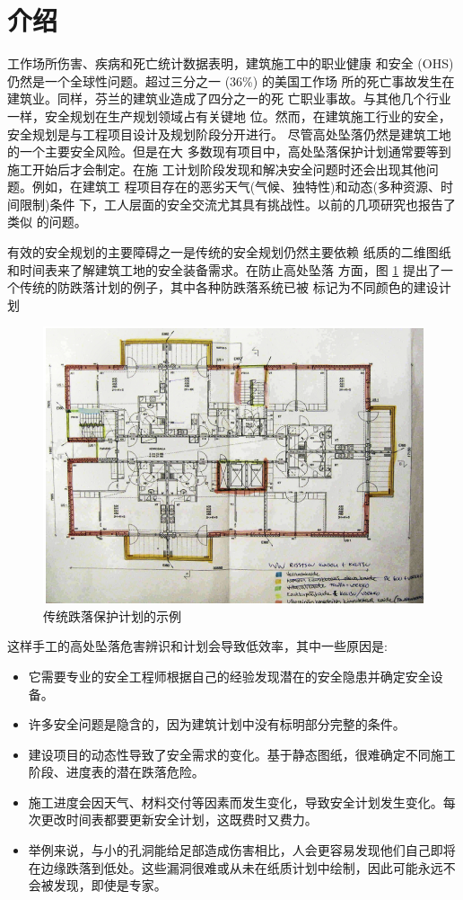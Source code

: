 \section{介绍}
工作场所伤害、疾病和死亡统计数据表明，建筑施工中的职业健康
和安全 (OHS) 仍然是一个全球性问题。超过三分之一 (36\%) 的美国工作场
所的死亡事故发生在建筑业。同样，芬兰的建筑业造成了四分之一的死
亡职业事故。与其他几个行业一样，安全规划在生产规划领域占有关键地
位。然而，在建筑施工行业的安全，安全规划是与工程项目设计及规划阶段分开进行。
尽管高处坠落仍然是建筑工地的一个主要安全风险。但是在大
多数现有项目中，高处坠落保护计划通常要等到施工开始后才会制定。在施
工计划阶段发现和解决安全问题时还会出现其他问题。例如，在建筑工
程项目存在的恶劣天气(气候、独特性)和动态(多种资源、时间限制)条件
下，工人层面的安全交流尤其具有挑战性。以前的几项研究也报告了类似
的问题。

有效的安全规划的主要障碍之一是传统的安全规划仍然主要依赖
纸质的二维图纸和时间表来了解建筑工地的安全装备需求。在防止高处坠落
方面，图 \ref{fig:c1f1} 提出了一个传统的防跌落计划的例子，其中各种防跌落系统已被
标记为不同颜色的建设计划

\begin{figure}[thbp!]
    \centering
    \includegraphics[width=0.8\linewidth]{res/c1f1.png}
    \caption{传统跌落保护计划的示例}
    \label{fig:c1f1}
    \end{figure}

这样手工的高处坠落危害辨识和计划会导致低效率，其中一些原因是:

\begin{itemize}
    \item 它需要专业的安全工程师根据自己的经验发现潜在的安全隐患并确定安全设备。
    \item 许多安全问题是隐含的，因为建筑计划中没有标明部分完整的条件。
    \item 建设项目的动态性导致了安全需求的变化。基于静态图纸，很难确定不同施工阶段、进度表的潜在跌落危险。
    \item 施工进度会因天气、材料交付等因素而发生变化，导致安全计划发生变化。每次更改时间表都要更新安全计划，这既费时又费力。
    \item 举例来说，与小的孔洞能给足部造成伤害相比，人会更容易发现他们自己即将在边缘跌落到低处。这些漏洞很难或从未在纸质计划中绘制，因此可能永远不会被发现，即使是专家。
\end{itemize}   

